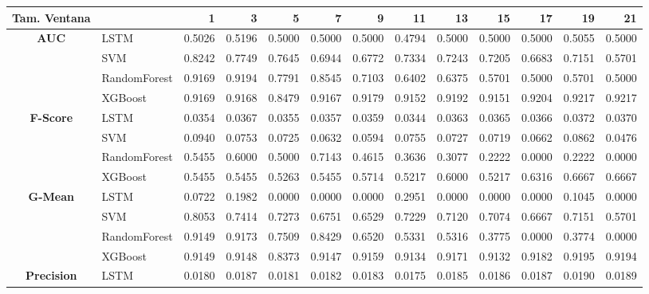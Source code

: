 \begin{table}[h]
	\centering
	\begin{adjustbox}{max width=15cm}
		\begin{tabular}{|c|l|r|r|r|r|r|r|r|r|r|r|r|}
			\hline
			\textbf{Tam. Ventana} &         &      1  &      3  &      5  &      7  &      9  &      11 &      13 &      15 &      17 &      19 &      21 \\
			\hline
			\textbf{AUC} & LSTM &  0.5026 &  0.5196 &  0.5000 &  0.5000 &  0.5000 &  0.4794 &  0.5000 &  0.5000 &  0.5000 &  0.5055 &  0.5000 \\
			& SVM &  0.8242 &  0.7749 &  0.7645 &  0.6944 &  0.6772 &  0.7334 &  0.7243 &  0.7205 &  0.6683 &  0.7151 &  0.5701 \\
			& RandomForest &  0.9169 &  0.9194 &  0.7791 &  0.8545 &  0.7103 &  0.6402 &  0.6375 &  0.5701 &  0.5000 &  0.5701 &  0.5000 \\
			& XGBoost &  0.9169 &  0.9168 &  0.8479 &  0.9167 &  0.9179 &  0.9152 &  0.9192 &  0.9151 &  0.9204 &  0.9217 &  0.9217 \\
			\hline
			\textbf{F-Score} & LSTM &  0.0354 &  0.0367 &  0.0355 &  0.0357 &  0.0359 &  0.0344 &  0.0363 &  0.0365 &  0.0366 &  0.0372 &  0.0370 \\
			& SVM &  0.0940 &  0.0753 &  0.0725 &  0.0632 &  0.0594 &  0.0755 &  0.0727 &  0.0719 &  0.0662 &  0.0862 &  0.0476 \\
			& RandomForest &  0.5455 &  0.6000 &  0.5000 &  0.7143 &  0.4615 &  0.3636 &  0.3077 &  0.2222 &  0.0000 &  0.2222 &  0.0000 \\
			& XGBoost &  0.5455 &  0.5455 &  0.5263 &  0.5455 &  0.5714 &  0.5217 &  0.6000 &  0.5217 &  0.6316 &  0.6667 &  0.6667 \\
			\hline
			\textbf{G-Mean} & LSTM &  0.0722 &  0.1982 &  0.0000 &  0.0000 &  0.0000 &  0.2951 &  0.0000 &  0.0000 &  0.0000 &  0.1045 &  0.0000 \\
			& SVM &  0.8053 &  0.7414 &  0.7273 &  0.6751 &  0.6529 &  0.7229 &  0.7120 &  0.7074 &  0.6667 &  0.7151 &  0.5701 \\
			& RandomForest &  0.9149 &  0.9173 &  0.7509 &  0.8429 &  0.6520 &  0.5331 &  0.5316 &  0.3775 &  0.0000 &  0.3774 &  0.0000 \\
			& XGBoost &  0.9149 &  0.9148 &  0.8373 &  0.9147 &  0.9159 &  0.9134 &  0.9171 &  0.9132 &  0.9182 &  0.9195 &  0.9194 \\
			\hline
			\textbf{Precision} & LSTM &  0.0180 &  0.0187 &  0.0181 &  0.0182 &  0.0183 &  0.0175 &  0.0185 &  0.0186 &  0.0187 &  0.0190 &  0.0189 \\

\end{tabular}
\end{adjustbox}
\end{table}
